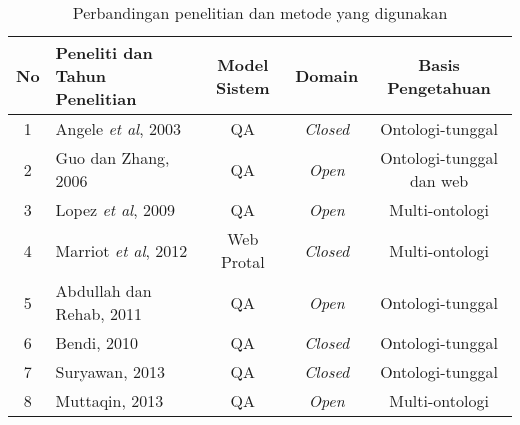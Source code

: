 \begin{landscape}
\begin{table}[h]
	\caption{Perbandingan penelitian dan metode yang digunakan}
	\label{table:perbandingan_penelitian}
	\begin{tabularx}{\linewidth}{|c|>{\centering\setlength}X|c|c|c|}
		\hline
		No & Peneliti dan Tahun Penelitian & Model Sistem & Domain & Basis Pengetahuan \\
		\hline
		1 & Angele \emph{et al}, 2003 & QA & \emph{Closed} & Ontologi-tunggal \\
		\hline
		2 & Guo dan Zhang, 2006 & QA & \emph{Open} & Ontologi-tunggal dan web \\
		\hline
		3 & Lopez \emph{et al}, 2009 & QA & \emph{Open} & Multi-ontologi \\
		\hline
		4 & Marriot \emph{et al}, 2012 & Web Protal & \emph{Closed} & Multi-ontologi \\
		\hline
		5 & Abdullah dan Rehab, 2011 & QA & \emph{Open} & Ontologi-tunggal \\
		\hline
		6 & Bendi, 2010 & QA & \emph{Closed} & Ontologi-tunggal \\
		\hline
		7 & Suryawan, 2013 & QA & \emph{Closed} & Ontologi-tunggal \\
		\hline
		8 & Muttaqin, 2013 & QA & \emph{Open} & Multi-ontologi \\
		\hline
	\end{tabularx}
\end{table}
\end{landscape}
